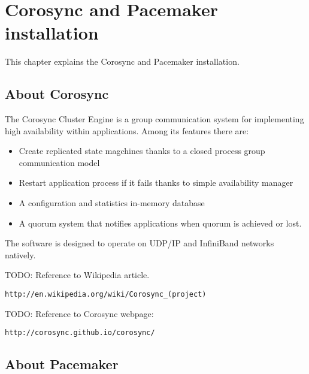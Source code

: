 

\chapter{Corosync and Pacemaker installation}
This chapter explains the Corosync and Pacemaker installation.

\section {About Corosync}
The Corosync Cluster Engine is a group communication system for implementing high availability within applications. Among its features there are:
\begin{itemize}
  \item Create replicated state magchines thanks to a closed process group communication model
  \item Restart application process if it fails thanks to simple availability manager
  \item A configuration and statistics in-memory database
  \item A quorum system that notifies applications when quorum is achieved or lost.
\end{itemize}


The software is designed to operate on UDP/IP and InfiniBand networks natively.

TODO: Reference to Wikipedia article.
\begin{verbatim}
http://en.wikipedia.org/wiki/Corosync_(project)
\end{verbatim}

TODO: Reference to Corosync webpage:
\begin{verbatim}
http://corosync.github.io/corosync/
\end{verbatim}

\section {About Pacemaker}

